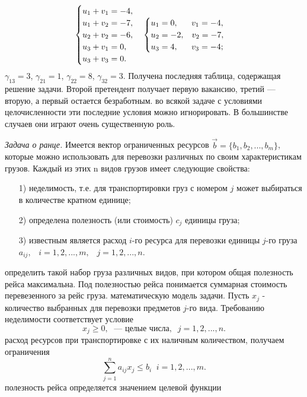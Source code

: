 $$
\begin{cases}
   u_1 + v_1 = -4,\\
   u_1 + v_2 = -7,\\
   u_2 + v_2 = -6,\\
   u_3 + v_1 = 0,\\
   u_3 + v_3 = 0.
\end{cases}
	\begin{cases}
		u_1 = 0,\hspace{3.7ex} v_1 = -4,\\
		u_2 = -2,\hspace{2ex} v_2 = -7,\\
		u_3 = 4,\hspace{3.7ex} v_3 = -4;
	\end{cases}
$$
$\gamma_{13}=3$, $\gamma_{21}=1$, $\gamma_{22}=8$, $\gamma_{32}=3$. Получена последняя таблица, содержащая решение задачи. Второй претендент получает первую вакансию, третий — вторую, а первый остается безработным.
 во всякой задаче с условиями целочисленности эти последние условия можно игнорировать. В большинстве случаев они играют очень существенную роль.
\par\textit{Задача о ранце.} Имеется вектор ограниченных ресурсов  $\vec b = \{b_1,b_2,...,b_m\}$, которые можно использовать для перевозки различных по своим характеристикам грузов. Каждый из этих n видов грузов имеет следующие свойства:
\begin{enumerate}
\item[1)] неделимость, т.е. для транспортировки груз с номером $j$ может выбираться в количестве кратном единице;
\item[2)] определена полезность (или стоимость) $c_j$ единицы груза;
\item[3)] известным является расход $i$-го ресурса для перевозки единицы $j$-го груза $a_{ij}, \;\;\; i=1,2,...,m,\;\;\; j=1,2,...,n$.
\end{enumerate}
 определить такой набор груза различных видов, при котором общая полезность рейса максимальна. Под полезностью рейса понимается суммарная стоимость перевезенного за рейс груза.
 математическую модель задачи. Пусть $x_j$ - количество выбранных для перевозки предметов $j$-го вида. Требованию неделимости соответствует условие
$$x_j \geq 0,\;\textrm{ — целые числа},\;\; j = 1,2,...,n.$$
 расход ресурсов при транспортировке с их наличным количеством, получаем ограничения
$$\sum_{j=1}^n a_{ij}x_j \leq b_i \;\; i = 1,2,...,m.$$
 полезность рейса определяется значением целевой функции
